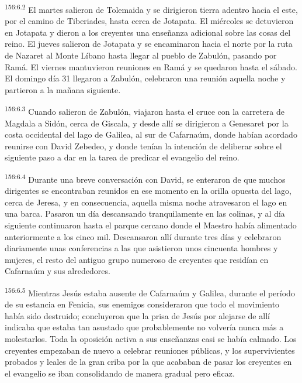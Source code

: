 \par 
\textsuperscript{156:6.2} El martes salieron de Tolemaida y se dirigieron tierra adentro hacia el este, por el camino de Tiberiades, hasta cerca de Jotapata. El miércoles se detuvieron en Jotapata y dieron a los creyentes una enseñanza adicional sobre las cosas del reino. El jueves salieron de Jotapata y se encaminaron hacia el norte por la ruta de Nazaret al Monte Líbano hasta llegar al pueblo de Zabulón, pasando por Ramá. El viernes mantuvieron reuniones en Ramá y se quedaron hasta el sábado. El domingo día 31 llegaron a Zabulón, celebraron una reunión aquella noche y partieron a la mañana siguiente.

\par 
\textsuperscript{156:6.3} Cuando salieron de Zabulón, viajaron hasta el cruce con la carretera de Magdala a Sidón, cerca de Giscala, y desde allí se dirigieron a Genesaret por la costa occidental del lago de Galilea, al sur de Cafarnaúm, donde habían acordado reunirse con David Zebedeo, y donde tenían la intención de deliberar sobre el siguiente paso a dar en la tarea de predicar el evangelio del reino.

\par 
\textsuperscript{156:6.4} Durante una breve conversación con David, se enteraron de que muchos dirigentes se encontraban reunidos en ese momento en la orilla opuesta del lago, cerca de Jeresa, y en consecuencia, aquella misma noche atravesaron el lago en una barca. Pasaron un día descansando tranquilamente en las colinas, y al día siguiente continuaron hasta el parque cercano donde el Maestro había alimentado anteriormente a los cinco mil. Descansaron allí durante tres días y celebraron diariamente unas conferencias a las que asistieron unos cincuenta hombres y mujeres, el resto del antiguo grupo numeroso de creyentes que residían en Cafarnaúm y sus alrededores.

\par 
\textsuperscript{156:6.5} Mientras Jesús estaba ausente de Cafarnaúm y Galilea, durante el período de su estancia en Fenicia, sus enemigos consideraron que todo el movimiento había sido destruido; concluyeron que la prisa de Jesús por alejarse de allí indicaba que estaba tan asustado que probablemente no volvería nunca más a molestarlos. Toda la oposición activa a sus enseñanzas casi se había calmado. Los creyentes empezaban de nuevo a celebrar reuniones públicas, y los supervivientes probados y leales de la gran criba por la que acababan de pasar los creyentes en el evangelio se iban consolidando de manera gradual pero eficaz.

